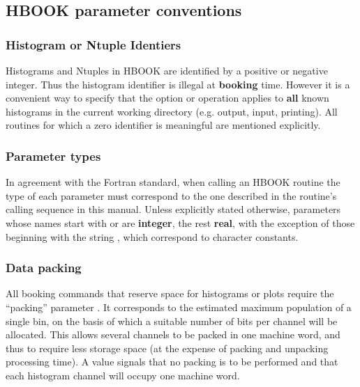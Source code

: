 \begin{center}
\end{center}
\Rind[HLIMIT]{}

\subsection{HBOOK parameter conventions}

\subsubsection*{Histogram or Ntuple Identiers}
 
Histograms and Ntuples in HBOOK are identified by a positive 
or negative integer.
Thus the histogram identifier  is illegal at {\bf booking} time.
However it is a convenient way to specify that the option or operation
applies to {\bf all} known histograms in the current
working directory (e.g. output, input, printing).
All routines for which a zero identifier is meaningful
are mentioned explicitly.

\subsubsection*{Parameter types}

In agreement with the Fortran standard, when calling an
HBOOK routine the type of each parameter must correspond to
the one described in the routine's calling sequence in this manual.
Unless explicitly stated otherwise, parameters whose  names
start with  or  are {\bf integer}, 
the rest {\bf real}, with the exception of those beginning 
with the string , which correspond to character constants. 

\subsubsection*{Data packing}

All booking commands that reserve space for histograms or plots
require the ``packing'' parameter .
It corresponds to the 
estimated maximum population of a single bin,
on the basis of which a suitable number of bits per channel will be
allocated.
This allows several channels to be packed in one machine word,
and thus to require less storage space (at the expense of packing
and unpacking processing time).
A value  signals that no packing is to be performed
and that each histogram channel will occupy one machine word.

